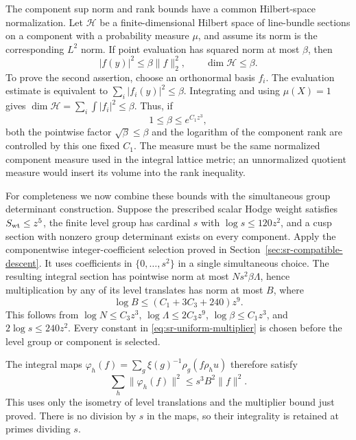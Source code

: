 The component sup norm and rank bounds have a common Hilbert-space
normalization.  Let \(\mathcal H\) be a finite-dimensional Hilbert
space of line-bundle sections on a component with a probability measure \(\mu\),
and assume its norm is the corresponding \(L^2\) norm.
If point evaluation has squared norm at most \(\beta\), then
\[
 |f(y)|^2\le\beta\|f\|_2^2,\qquad
 \dim\mathcal H\le\beta.
\]
To prove the second assertion, choose an orthonormal basis \(f_i\).
The evaluation estimate is equivalent to
\(\sum_i|f_i(y)|^2\le\beta\).
Integrating and using \(\mu(X)=1\) gives
\(\dim\mathcal H=\sum_i\int|f_i|^2\le\beta\).
Thus, if
\begin{equation}\label{eq:sr-bergman-input}
 1\le\beta\le e^{C_1z^3},
\end{equation}
both the pointwise factor \(\sqrt\beta\le\beta\) and the logarithm of
the component rank are controlled by this one fixed \(C_1\).
The measure must be the same normalized component measure used in
the integral lattice metric; an unnormalized quotient measure would
insert its volume into the rank inequality.

For completeness we now combine these bounds with the simultaneous
group determinant construction.  Suppose the prescribed scalar
Hodge weight satisfies \(S_{\rm wt}\le z^5\), the finite level group
has cardinal \(s\) with \(\log s\le120z^2\), and a cusp section with
nonzero group determinant exists on every component.
Apply the componentwise integer-coefficient selection proved in
Section~\ref{sec:sr-compatible-descent}.  It uses coefficients in
\(\{0,\ldots,s^2\}\) in a single simultaneous choice.
The resulting integral section has pointwise norm at most
\(N s^2\beta\Lambda\), hence multiplication by any of its level
translates has norm at most \(B\), where
\begin{equation}\label{eq:sr-uniform-multiplier}
 \log B\le (C_1+3C_3+240)z^9.
\end{equation}
This follows from
\(\log N\le C_3z^3\),
\(\log\Lambda\le2C_3z^9\),
\(\log\beta\le C_1z^3\), and \(2\log s\le240z^2\).
Every constant in \eqref{eq:sr-uniform-multiplier} is chosen before
the level group or component is selected.

The integral maps
\(\varphi_h(f)=\sum_g\xi(g)^{-1}\rho_g(f\rho_hu)\)
therefore satisfy
\[
 \sum_h\|\varphi_h(f)\|^2\le s^3 B^2\|f\|^2.
\]
This uses only the isometry of level translations and the multiplier
bound just proved.  There is no division by \(s\) in the maps, so
their integrality is retained at primes dividing \(s\).

